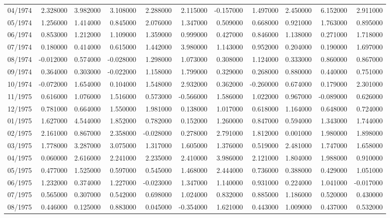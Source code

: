 \begin{tabular}{lrrrrrrrrrr}
04/1974 & 2.328000 & 3.982000 & 3.108000 & 2.288000 & 2.115000 & -0.157000 & 1.497000 & 2.450000 & 6.152000 & 2.911000 \\
05/1974 & 1.256000 & 1.414000 & 0.845000 & 2.076000 & 1.347000 & 0.509000 & 0.668000 & 0.921000 & 1.763000 & 0.895000 \\
06/1974 & 0.853000 & 1.212000 & 1.109000 & 1.359000 & 0.999000 & 0.427000 & 0.846000 & 1.138000 & 0.271000 & 1.718000 \\
07/1974 & 0.180000 & 0.414000 & 0.615000 & 1.442000 & 3.980000 & 1.143000 & 0.952000 & 0.204000 & 0.190000 & 1.697000 \\
08/1974 & -0.012000 & 0.574000 & -0.028000 & 1.298000 & 1.073000 & 0.308000 & 1.124000 & 0.333000 & 0.860000 & 0.867000 \\
09/1974 & 0.364000 & 0.303000 & -0.022000 & 1.158000 & 1.799000 & 0.329000 & 0.268000 & 0.880000 & 0.440000 & 0.751000 \\
10/1974 & -0.072000 & 1.654000 & 0.104000 & 1.548000 & 2.932000 & 0.362000 & -0.260000 & 0.674000 & 0.179000 & 2.301000 \\
11/1975 & 0.616000 & 1.076000 & 1.516000 & 0.573000 & -0.566000 & 1.586000 & 1.022000 & 0.967000 & -0.089000 & 0.626000 \\
12/1975 & 0.781000 & 0.664000 & 1.550000 & 1.981000 & 0.138000 & 1.017000 & 0.618000 & 1.164000 & 0.648000 & 0.724000 \\
01/1975 & 1.627000 & 4.544000 & 1.852000 & 0.782000 & 0.152000 & 1.260000 & 0.847000 & 0.594000 & 1.343000 & 1.744000 \\
02/1975 & 2.161000 & 0.867000 & 2.358000 & -0.028000 & 0.278000 & 2.791000 & 1.812000 & 0.001000 & 1.980000 & 1.898000 \\
03/1975 & 1.778000 & 3.287000 & 3.075000 & 1.317000 & 1.605000 & 1.376000 & 0.519000 & 2.481000 & 1.747000 & 1.658000 \\
04/1975 & 0.060000 & 2.616000 & 2.241000 & 2.235000 & 2.410000 & 3.986000 & 2.121000 & 1.804000 & 1.988000 & 0.910000 \\
05/1975 & 0.477000 & 1.525000 & 0.597000 & 0.545000 & 1.468000 & 2.444000 & 0.736000 & 0.388000 & 0.429000 & 1.051000 \\
06/1975 & 1.232000 & 0.374000 & 1.227000 & -0.023000 & 1.347000 & 1.140000 & 0.931000 & 0.224000 & 1.041000 & -0.017000 \\
07/1975 & 0.565000 & 0.307000 & 0.542000 & 0.698000 & 1.024000 & 0.832000 & 0.885000 & 1.186000 & 0.520000 & 0.430000 \\
08/1975 & 0.446000 & 0.125000 & 0.883000 & 0.045000 & -0.354000 & 1.621000 & 0.443000 & 1.009000 & 0.437000 & 0.532000 \\

\end{tabular}
